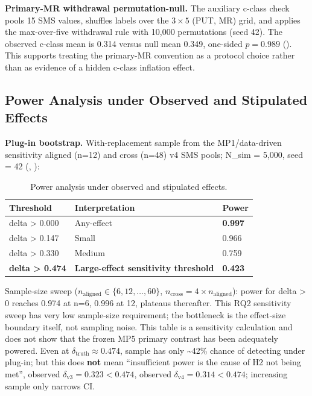 \documentclass[manuscript,screen,review]{acmart}
\begin{document}
\textbf{Primary-MR withdrawal permutation-null.} The auxiliary c-class
check pools 15 SMS values, shuffles labels over the $3 \times 5$ (PUT,
MR) grid, and applies the max-over-five withdrawal rule with 10,000
permutations (seed 42). The observed c-class mean is 0.314 versus null
mean 0.349, one-sided $p = 0.989$
(). This supports treating
the primary-MR convention as a protocol choice rather than as evidence of
a hidden c-class inflation effect.

\subsection{Power Analysis under Observed and Stipulated Effects}\label{d.3-power-analysis-plug-in-and-stipulated-alternative}

\textbf{Plug-in bootstrap.} With-replacement sample from the MP1/data-driven
sensitivity aligned (n=12) and cross (n=48) v4 SMS pools; N\_sim = 5,000, seed = 42
(, ):

{%
\begin{longtable}[]{@{}lll@{}}
\caption{Power analysis under observed and stipulated effects.}\label{tab:p2-23}\\
\toprule\noalign{}
Threshold & Interpretation & Power \\
\midrule\noalign{}
\endfirsthead
\endhead
\bottomrule\noalign{}
\endlastfoot
delta \textgreater{} 0.000 & Any-effect & \textbf{0.997} \\
delta \textgreater{} 0.147 & Small & 0.966 \\
delta \textgreater{} 0.330 & Medium & 0.759 \\
\textbf{delta \textgreater{} 0.474} & \textbf{Large-effect sensitivity threshold} &
\textbf{0.423} \\
\end{longtable}
}

Sample-size sweep ($n_{\mathrm{aligned}} \in \{6, 12, \ldots, 60\}$, $n_{\mathrm{cross}} = 4 \times n_{\mathrm{aligned}}$):
power for delta \textgreater{} 0 reaches 0.974 at n=6, 0.996 at 12,
plateaus thereafter. This RQ2 sensitivity sweep has very low sample-size
requirement; the bottleneck is the effect-size boundary itself, not
sampling noise. This table is a sensitivity calculation and does not show
that the frozen MP5 primary contrast has been adequately powered. Even at $\delta_{\mathrm{truth}} \approx 0.474$, sample has only
\textasciitilde42\% chance of detecting under plug-in; but this does
\textbf{not} mean ``insufficient power is the cause of H2 not being
met'', observed $\delta_{\mathrm{v3}} = 0.323 < 0.474$, observed
$\delta_{\mathrm{v4}} = 0.314 < 0.474$; increasing sample only narrows CI.
\end{document}
